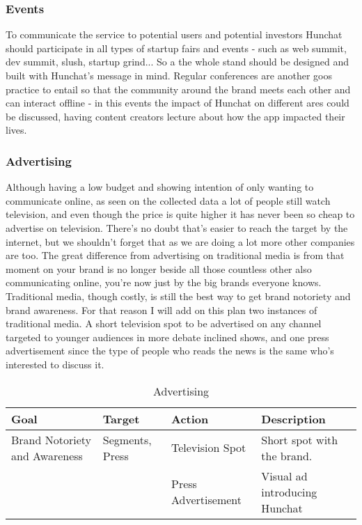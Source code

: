 \documentclass[12pt]{article}
\begin{document}
	\subsubsection{Events}
	To communicate the service to potential users and potential investors Hunchat should participate in all types of startup fairs and events - such as web summit, dev summit, slush, startup grind... So a the whole stand should be designed and built with Hunchat's message in mind. Regular conferences are another goos practice to entail so that the community around the brand meets each other and can interact offline - in this events the impact of Hunchat on different ares could be discussed, having content creators lecture about how the app impacted their lives.
	
	\subsubsection{Advertising}
	Although having a low budget and showing intention of only wanting to communicate online, as seen on the collected data a lot of people still watch television, and even though the price is quite higher it has never been so cheap to advertise on television. There's no doubt that's easier to reach the target by the internet, but we shouldn't forget that as we are doing a lot more other companies are too. The great difference from advertising on traditional media is from that moment on your brand is no longer beside all those countless other also communicating online, you're now just by the big brands everyone knows. Traditional media, though costly, is still the best way to get brand notoriety and brand awareness. For that reason I will add on this plan two instances of traditional media. A short television spot to be advertised on any channel targeted to younger audiences in more debate inclined shows, and one press advertisement since the type of people who reads the news is the same who's interested to discuss it. 
	
	\begin{table}[htbp]
	\small
	\caption{Advertising}
	\label{table:advertising}
	\centering
	\begin{tabular}{ @{}P{0.18\textwidth}P{0.17\textwidth}P{0.16\textwidth}P{0.38\textwidth} }
Goal	&	Target		&	Action	&	Description	 \\ \hline
Brand Notoriety and Awareness	&	Segments, Press  &	Television Spot	& 	Short spot with the brand. \\
 &  & Press Advertisement & Visual ad introducing Hunchat 
	 \\ \hline
	\end{tabular}
	\end{table}
	
\end{document}
